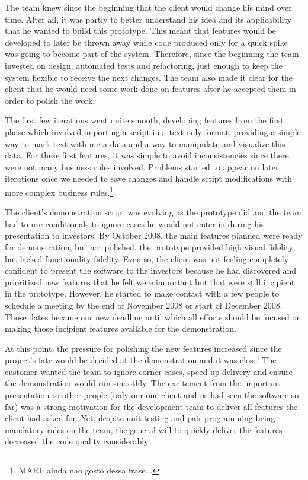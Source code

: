 \documentclass[lnbip]{svmultln}
\newcommand{\mari}[1]{\footnote{MARI: #1}}
\begin{document}
The team knew since the beginning that the client would change his mind over
time. After all, it was partly to better understand his idea and its
applicability that he wanted to build this prototype. This meant that features
would be developed to later be thrown away while code produced only for a quick
spike was going to become part of the system. Therefore, since the beginning the
team invested on design, automated tests and refactoring, just enough to keep
the system flexible to receive the next changes. The team also made it clear for
the client that he would need some work done on features after he accepted them
in order to polish the work.

The first few iterations went quite smooth, developing features from the first
phase which involved importing a script in a text-only format, providing a
simple way to mark text with meta-data and a way to manipulate and visualize
this data. For these first features, it was simple to avoid inconsistencies
since there were not many business rules involved. Problems started to appear on
later iterations once we needed to save changes and handle script modifications
with more complex business rules.\mari{ainda nao gosto dessa frase...}

The client's demonstration script was evolving as the prototype did and the team
had to use conditionals to ignore cases he would not enter in during his
presentation to investors. By October 2008, the main features planned were ready
for demonstration, but not polished, the prototype provided high visual fidelity
but lacked functionality fidelity. Even so, the client was not feeling
completely confident to present the software to the investors because he had
discovered and prioritized new features that he felt were important but that
were still incipient in the prototype. However, he started to make contact with
a few people to schedule a meeting by the end of November 2008 or start of
December 2008. Those dates became our new deadline until which all efforts
should be focused on making those incipient features available for the
demonstration.

At this point, the pressure for polishing the new features increased since the
project's fate would be decided at the demonstration and it was close! The
customer wanted the team to ignore corner cases, speed up delivery and ensure
the demonstration would run smoothly. The excitement from the important
presentation to other people (only our one client and us had seen the software
so far) was a strong motivation for the development team to deliver all features
the client had asked for. Yet, despite unit testing and pair programming being
mandatory rules on the team, the general will to quickly deliver the features
decreased the code quality considerably.
\end{document}
